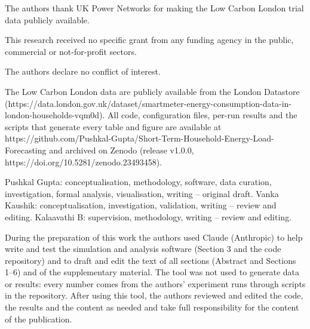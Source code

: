 \begin{declarations}
 The authors thank UK Power Networks for making the Low Carbon London trial data publicly available.

 This research received no specific grant from any funding agency in the public, commercial or not-for-profit sectors.

 The authors declare no conflict of interest.

 The Low Carbon London data are publicly available from the London Datastore (https://data.london.gov.uk/dataset/smartmeter-energy-consumption-data-in-london-households-vqm0d). All code, configuration files, per-run results and the scripts that generate every table and figure are available at https://github.com/Pushkal-Gupta/Short-Term-Household-Energy-Load-Forecasting and archived on Zenodo (release v1.0.0, https://doi.org/10.5281/zenodo.23493458).

 Pushkal Gupta: conceptualisation, methodology, software, data curation, investigation, formal analysis, visualisation, writing -- original draft. Vanka Kaushik: conceptualisation, investigation, validation, writing -- review and editing. Kalaavathi B: supervision, methodology, writing -- review and editing.

 During the preparation of this work the authors used Claude (Anthropic) to help write and test the simulation and analysis software (Section 3 and the code repository) and to draft and edit the text of all sections (Abstract and Sections 1--6) and of the supplementary material. The tool was not used to generate data or results: every number comes from the authors' experiment runs through scripts in the repository. After using this tool, the authors reviewed and edited the code, the results and the content as needed and take full responsibility for the content of the publication.
\end{declarations}
